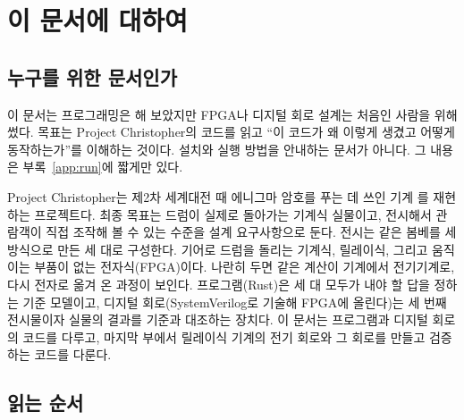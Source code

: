 \chapter{이 문서에 대하여}

\section{누구를 위한 문서인가}

이 문서는 프로그래밍은 해 보았지만 FPGA나 디지털 회로 설계는 처음인 사람을 위해 썼다. 목표는 Project
Christopher의 코드를 읽고 ``이 코드가 왜 이렇게 생겼고 어떻게 동작하는가''를 이해하는 것이다.
설치와 실행 방법을 안내하는 문서가 아니다. 그 내용은 부록~\ref{app:run}에 짧게만 있다.

Project Christopher는 제2차 세계대전 때 에니그마 암호를 푸는 데 쓰인 기계 를
재현하는 프로젝트다. 최종 목표는 드럼이 실제로 돌아가는 기계식 실물이고, 전시해서 관람객이 직접 조작해
볼 수 있는 수준을 설계 요구사항으로 둔다. 전시는 같은 봄베를 세 방식으로 만든 세 대로 구성한다.
기어로 드럼을 돌리는 기계식, 릴레이식, 그리고 움직이는 부품이 없는 전자식(FPGA)이다. 나란히 두면 같은
계산이 기계에서 전기기계로, 다시 전자로 옮겨 온 과정이 보인다. 프로그램(Rust)은 세 대 모두가 내야 할
답을 정하는 기준 모델이고, 디지털 회로(SystemVerilog로 기술해 FPGA에 올린다)는 세 번째 전시물이자 실물의
결과를 기준과 대조하는 장치다. 이 문서는 프로그램과 디지털 회로의 코드를 다루고, 마지막 부에서 릴레이식
기계의 전기 회로와 그 회로를 만들고 검증하는 코드를 다룬다.

\section{읽는 순서}

